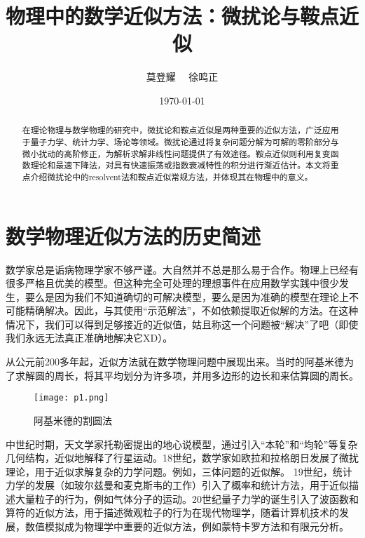 \documentclass[12pt, a4paper, oneside]{ctexart}
\title{\textbf{物理中的数学近似方法：微扰论与鞍点近似}}
\author{莫登耀 \ \ 徐鸣正}
\date{\today}
\begin{document}
\maketitle

\setcounter{page}{0}
\maketitle
\thispagestyle{empty}

\begin{abstract}
    在理论物理与数学物理的研究中，微扰论和鞍点近似是两种重要的近似方法，广泛应用于量子力学、统计力学、场论等领域。微扰论通过将复杂问题分解为可解的零阶部分与微小扰动的高阶修正，为解析求解非线性问题提供了有效途径。鞍点近似则利用复变函数理论和最速下降法，对具有快速振荡或指数衰减特性的积分进行渐近估计。本文将重点介绍微扰论中的resolvent法和鞍点近似常规方法，并体现其在物理中的意义。
\end{abstract}

\newpage
{}
\setcounter{page}{1}
\tableofcontents
\newpage
\setcounter{page}{1}

\section{数学物理近似方法的历史简述}


数学家总是诟病物理学家不够严谨。大自然并不总是那么易于合作。物理上已经有很多严格且优美的模型。但这种完全可处理的理想事件在应用数学实践中很少发生，要么是因为我们不知道确切的可解决模型，要么是因为准确的模型在理论上不可能精确解决。因此，与其使用“示范解法”，不如依赖提取近似解的方法。在这种情况下，我们可以得到足够接近的近似值，姑且称这一个问题被“解决”了吧（即使我们永远无法真正准确地解决它XD）。

从公元前200多年起，近似方法就在数学物理问题中展现出来。当时的阿基米德为了求解圆的周长，将其平均划分为许多项，并用多边形的边长和来估算圆的周长。

\begin{figure}[htbp]
    \centering
    \texttt{[image: p1.png]}
    \vspace{10pt} %
	\caption{阿基米德的割圆法}
\end{figure}

中世纪时期，天文学家托勒密提出的地心说模型，通过引入“本轮”和“均轮”等复杂几何结构，近似地解释了行星运动。18世纪，数学家如欧拉和拉格朗日发展了微扰理论，用于近似求解复杂的力学问题。例如，三体问题的近似解。
19世纪，统计力学的发展（如玻尔兹曼和麦克斯韦的工作）引入了概率和统计方法，用于近似描述大量粒子的行为，例如气体分子的运动。20世纪量子力学的诞生引入了波函数和算符的近似方法，用于描述微观粒子的行为在现代物理学，随着计算机技术的发展，数值模拟成为物理学中重要的近似方法，例如蒙特卡罗方法和有限元分析。
\end{document}
